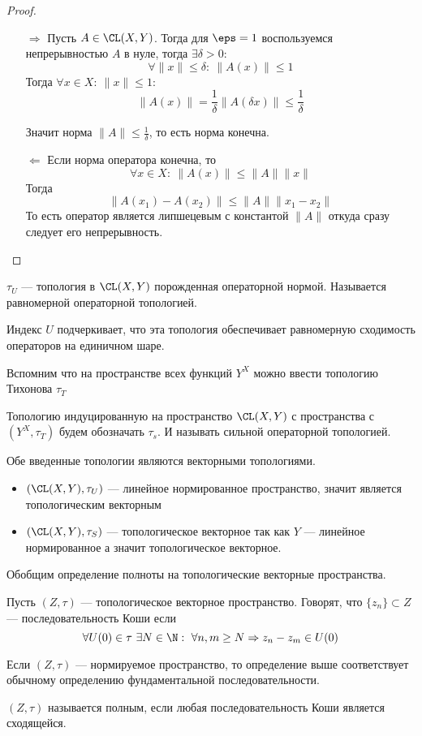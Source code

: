 \begin{proof}
	\begin{enumerate}
		\item[$\Rightarrow$] Пусть $A \in \CL(X, Y)$. Тогда для $\eps =1$ воспользуемся непрерывностью $A$ в нуле, тогда $\exists \delta > 0$: 
	$$
	\forall \|x\| \leq \delta: \ \|A(x)\| \leq 1 
	$$
	Тогда $\forall x \in X: \  \|x\| \leq 1$:
	$$
	\|A(x)\| = \frac{1}{\delta}\|A(\delta x)\| \leq  \frac{1}{\delta}
	$$

	Значит норма $\|A\| \leq \frac{1}{\delta}$, то есть норма конечна.
	\item[$\Leftarrow$] Если норма оператора конечна, то 
	$$
	\forall x \in X: \ \|A(x)\| \leq \|A\| \|x\|
	$$
	Тогда 
	$$
	\|A(x_1) - A(x_2)\| \leq \|A\| \|x_1 - x_2\|
	$$
	То есть оператор является липшецевым с константой $\|A\|$ откуда сразу следует его непрерывность.
	\end{enumerate}
\end{proof}
\begin{definition}
	$\tau_U$ --- топология в $\CL(X,Y)$ порожденная операторной нормой. Называется равномерной операторной топологией.
\end{definition}
\begin{remark}
	Индекс $U$ подчеркивает, что эта топология обеспечивает равномерную сходимость операторов на единичном шаре.
\end{remark}
Вспомним что на пространстве всех функций $Y^X$ можно ввести топологию Тихонова $\tau_T$
\begin{definition}
	Топологию индуцированную на пространство $\CL(X,Y)$ с пространства с $(Y^X, \tau_T)$ будем обозначать $\tau_s$. И называть сильной операторной топологией. 
\end{definition}
Обе введенные топологии являются векторными топологиями.
\begin{itemize}
	\item $(\CL(X,Y), \tau_U)$ --- линейное нормированное пространство, значит является топологическим векторным
	\item $(\CL(X,Y), \tau_S)$ --- топологическое векторное так как $Y$ --- линейное нормированное а значит топологическое векторное.
\end{itemize}
Обобщим определение полноты на топологические векторные пространства.
\begin{definition}
	Пусть $(Z, \tau)$ --- топологическое векторное пространство. Говорят, что $\{z_n\} \subset Z$ --- последовательность Коши если
	$$
	\forall U(0) \in \tau \ \exists N \in \N: \ \forall n,m \geq N \Rightarrow z_n - z_m \in U(0)
	$$
\end{definition}
\begin{remark}
	Если $(Z, \tau)$ --- нормируемое пространство, то определение выше соответствует обычному определению фундаментальной последовательности.
\end{remark}
\begin{definition}
	$(Z, \tau)$ называется полным, если любая последовательность Коши является сходящейся. 
\end{definition}

